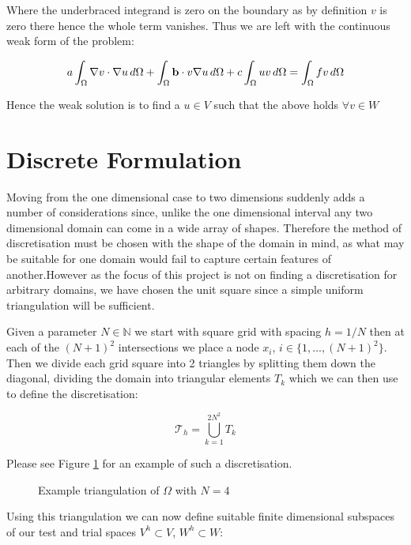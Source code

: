 Where the underbraced integrand is zero on the boundary as by definition $v$ is
zero there hence the whole term vanishes. Thus we are left with the continuous
weak form of the problem:

\begin{equation}\label{eq:wk-twod-deterministic}
    a\int_{\Omega}\nabla{v}\cdot\nabla{u}\,d\Omega +
    \int_{\Omega}\mathbf{b}\cdot v\nabla{u}\,d\Omega + c\int_{\Omega}uv\,d\Omega =
    \int_{\Omega}fv\,d\Omega
\end{equation}

Hence the weak solution is to find a $u \in V$ such that the above holds
$\forall v \in W$

\section{Discrete Formulation}


Moving from the one dimensional case to two dimensions suddenly adds a number
of considerations since, unlike the one dimensional interval any two
dimensional domain can come in a wide array of shapes. Therefore the method of
discretisation must be chosen with the shape of the domain in mind, as what may
be suitable for one domain would fail to capture certain features of
another.However as the focus of this project is not on finding a discretisation
for arbitrary domains, we have chosen the unit square since a simple uniform
triangulation will be sufficient.

Given a parameter $N \in \mathbb{N}$ we start with square grid with spacing $h
= 1/N$ then at each of the $(N+1)^2$ intersections we place a node $x_i$, $i
\in \{1,\ldots,(N+1)^2\}$. Then we divide each grid square into 2 triangles by
splitting them down the diagonal, dividing the domain into triangular elements
$T_k$ which we can then use to define the discretisation:

\[
    \mathcal{T}_h = \bigcup_{k=1}^{2N^2} T_k
\]

Please see Figure \ref{fig:two-d-discretisation} for an example of such a
discretisation.

\begin{figure}
\centering

\caption{Example triangulation of $\Omega$ with $N = 4$}
\label{fig:two-d-discretisation}
\end{figure}

Using this triangulation we can now define suitable finite dimensional subspaces
of our test and trial spaces $V^h \subset V$, $W^h \subset W$:

